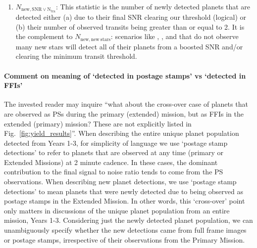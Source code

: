 \begin{enumerate}
	\item $N_\mathrm{new,SNR\lor N_{tra}}$:
	This statistic is the number of newly detected planets that are detected either (a) due to their final SNR clearing our threshold (logical) or (b) their number of observed transits being greater than or equal to 2.
	It is the complement to $N_\mathrm{new,new\ stars}$: scenarios like \nhemi, \npole, and \hemis\:that do not observe many new stars will detect all of their planets from a boosted SNR and/or clearing the minimum transit threshold.
	
\end{enumerate}

\paragraph{Comment on meaning of `detected in postage stamps' vs `detected in FFIs'}
The invested reader may inquire ``what about the cross-over case of planets that are observed as PSs during the primary (extended) mission, but as FFIs in the extended (primary) mission? These are not explicitly listed in Fig.~\ref{fig:yield_results}''.
When describing the entire unique planet population detected from Years 1-3, for simplicity of language we use `postage stamp detections' to refer to planets that are observed at any time (primary or Extended Missions) at 2 minute cadence.
In these cases, the dominant contribution to the final signal to noise ratio tends to come from the PS observations.
When describing new planet detections, we use `postage stamp detections' to mean planets that were newly detected due to being observed as postage stamps in the Extended Mission.
In other words, this `cross-over' point only matters in discussions of the unique planet population from an entire mission, Years 1-3.
Considering just the newly detected planet population, we can unambiguously specify whether the new detections came from full frame images or postage stamps, irrespective of their observations from the Primary Mission.
